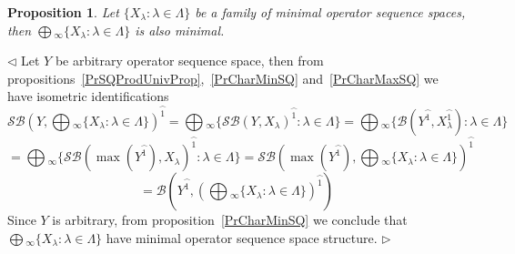 \documentclass[12pt]{article}
\newtheorem{proposition}[theorem]{Proposition}
\newenvironment{proof}{\par $\triangleleft$}{$\triangleright$}
\begin{document}
\begin{proposition}\label{PrMinCommuteWithProd} 
Let $ \{X_\lambda:\lambda\in\Lambda \}$ be a family of minimal operator 
sequence spaces, then $\bigoplus{}_\infty \{X_\lambda:\lambda\in\Lambda \}$ 
is also minimal.
\end{proposition} 
\begin{proof}
Let $Y$ be arbitrary operator sequence space, 
then from propositions~\ref{PrSQProdUnivProp},~\ref{PrCharMinSQ} 
and~\ref{PrCharMaxSQ} we have isometric identifications
$$
\mathcal{SB}{\left(
    Y,\bigoplus{}_\infty \{X_\lambda:\lambda\in\Lambda \}
\right)}^{\wideparen{1}}
=\bigoplus{}_\infty \{
    {\mathcal{SB}(Y,X_\lambda)}^{\wideparen{1}}:\lambda\in\Lambda
 \}
=\bigoplus{}_\infty \{
    \mathcal{B}(Y^{\wideparen{1}},X_\lambda^{\wideparen{1}}):\lambda\in\Lambda
 \}
$$
$$
=\bigoplus{}_\infty \{
    {\mathcal{SB}(\max(Y^{\wideparen{1}}),X_\lambda)}^{\wideparen{1}}
    :\lambda\in\Lambda
 \}
=\mathcal{SB}{\left(
    \max(Y^{\wideparen{1}}),\bigoplus{}_\infty \{
        X_\lambda:\lambda\in\Lambda
     \}
\right)}^{\wideparen{1}}
$$
$$
=\mathcal{B}\left(
    Y^{\wideparen{1}},{\left(\bigoplus{}_\infty \{
        X_\lambda:\lambda\in\Lambda
     \}\right)}^{\wideparen{1}}
\right)
$$
Since $Y$ is arbitrary, from proposition~\ref{PrCharMinSQ} we conclude 
that $\bigoplus{}_\infty \{X_\lambda:\lambda\in\Lambda \}$ have minimal operator 
sequence space structure.
\end{proof}
\end{document}
